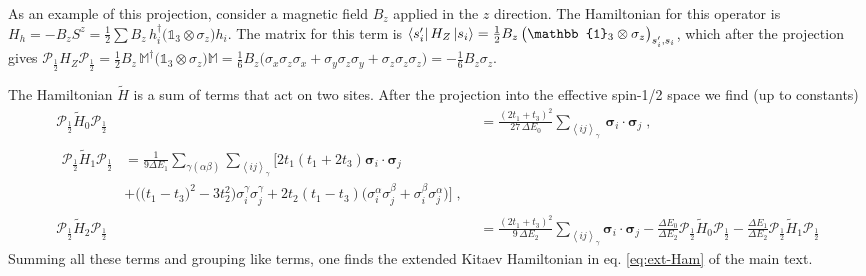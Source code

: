 As an example of this projection, consider a magnetic field $B_z$ applied in the $z$ direction. The Hamiltonian for this operator is $ { H } _{h}=-B_z S^z=\frac{1}{2}\sum B_z \, h_i^\dagger \big(\mathbb{1}_3\otimes\sigma_z\big)h_i$. The matrix for this term is $\bra{s_i'}    { H } _{Z} \ket{s_i} =  \frac{1}{2}B_z \,   \big(\mathbb{1}_3\otimes\sigma_z\big)_{s_i',s_i}$, which after the projection gives
$\mathcal{P}_{\frac{1}{2}}  { H } _{Z}  \mathcal{P}_{\frac{1}{2}} =  \frac{1}{2}B_z \,   \mathbb{M}^\dagger \big(\mathbb{1}_3\otimes\sigma_z\big) \mathbb{M} = \frac{1}{6} B_z \big( \sigma_x\sigma_z\sigma_x+\sigma_y\sigma_z\sigma_y+\sigma_z\sigma_z\sigma_z \big) = - \frac{1}{6} B_z \sigma_z  $.

The Hamiltonian $\tilde{ { H } }$ is a sum of terms that act on two sites.
After the projection into the effective spin-1/2 space we find (up to constants)
\begin{align}
    \mathcal{P}_{\frac{1}{2}}\tilde{ { H } }_0   \mathcal{P}_{\frac{1}{2}}
    &=
    \frac{(2  t_{1}+ t_{3})^2}{27 \, \Delta E_0}
    \sum_{\left<ij\right>_\gamma } \, \bm{\sigma}_i\cdot\bm{\sigma}_j
    \;,\\
    \begin{split}
        \mathcal{P}_{\frac{1}{2}}\tilde{ { H } }_1   \mathcal{P}_{\frac{1}{2}}
    &=
    \frac{1}{9\Delta E_1} \sum_{\gamma(\alpha\beta)}
    \sum_{\left<ij\right>_\gamma } \Bigg[
    2t_{1} ( t_{1}+2  t_{3}) \bm{\sigma}_i\cdot\bm{\sigma}_j
    \\ &+  \Big(\big( t_{1}- t_{3}\big)^2-3t_{2}^2 \Big) \sigma_i^\gamma\sigma_j^\gamma
    + 2t_{2} ( t_{1}- t_{3})    \big(\sigma_i^\alpha \sigma_j^\beta +\sigma_i^\beta \sigma_j^\alpha  \big)  \Bigg]
    \; ,
    \end{split} \\
    \mathcal{P}_{\frac{1}{2}}\tilde{ { H } }_2   \mathcal{P}_{\frac{1}{2}}
    &=
    \frac{(2  t_{1}+ t_{3})^2}{9 \, \Delta E_2}
    \sum_{\left<ij\right>_\gamma }  \bm{\sigma}_i\cdot\bm{\sigma}_j
    -\frac{\Delta E_0}{\Delta E_2} \mathcal{P}_{\frac{1}{2}}\tilde{ { H } }_0   \mathcal{P}_{\frac{1}{2}}
    -\frac{\Delta E_1}{\Delta E_2}\mathcal{P}_{\frac{1}{2}}\tilde{ { H } }_1   \mathcal{P}_{\frac{1}{2}}
\end{align}
Summing all these terms and grouping like terms,
one finds the extended Kitaev Hamiltonian in eq. \eqref{eq:ext-Ham} of the main text.



